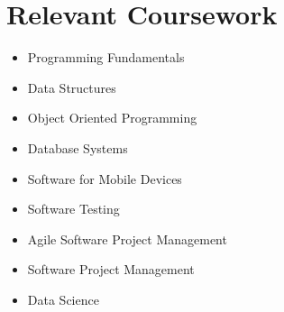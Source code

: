 \documentclass[letterpaper,11pt]{article}
\makeatletter
\newcommand{\resumeItem}[1]{
  \item\small{
    {#1 \vspace{-2pt}}
  }
}
\newcommand{\resumeSubheading}[4]{
  \vspace{-2pt}\item
    \begin{tabular*}{1.0\textwidth}[t]{l@{\extracolsep{\fill}}r}
      \textbf{#1} & \textbf{\small #2} \\
      \textit{\small#3} & \textit{\small #4} \\
    \end{tabular*}\vspace{-7pt}
}
\newcommand{\resumeSubHeadingListStart}{\begin{itemize}[leftmargin=0.0in, label={}]}
\newcommand{\resumeSubHeadingListEnd}{\end{itemize}}
\newcommand{\resumeItemListStart}{\begin{itemize}}
\newcommand{\resumeItemListEnd}{\end{itemize}\vspace{-5pt}}
\makeatother
\begin{document}
\section{Relevant Coursework}
        \begin{multicols}{3}
            \begin{itemize}[itemsep=-5pt, parsep=3pt]
                \item \small Programming Fundamentals
                \item \small Data Structures
                \item \small Object Oriented Programming
                \item \small Database Systems	
                \item \small Software for Mobile Devices
                \item \small Software Testing
                \item \small Agile Software Project Management
                \item \small Software Project Management
                \item \small Data Science
            \end{itemize}
        \end{multicols}
        \vspace*{2.0\multicolsep}











\end{document}
